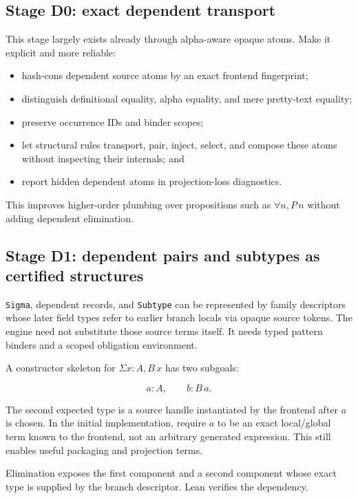 \documentclass[11pt]{article}
\newcommand{\code}[1]{\texttt{#1}}
\begin{document}
\subsection{Stage D0: exact dependent transport}

This stage largely exists already through alpha-aware opaque atoms.  Make it
explicit and more reliable:

\begin{itemize}
  \item hash-cons dependent source atoms by an exact frontend fingerprint;
  \item distinguish definitional equality, alpha equality, and mere pretty-text
    equality;
  \item preserve occurrence IDs and binder scopes;
  \item let structural rules transport, pair, inject, select, and compose these
    atoms without inspecting their internals; and
  \item report hidden dependent atoms in projection-loss diagnostics.
\end{itemize}

This improves higher-order plumbing over propositions such as
\(\forall n, P\,n\) without adding dependent elimination.

\subsection{Stage D1: dependent pairs and subtypes as certified structures}

\code{Sigma}, dependent records, and \code{Subtype} can be represented by
family descriptors whose later field types refer to earlier branch locals via
opaque source tokens.  The engine need not substitute those source terms
itself.  It needs typed pattern binders and a scoped obligation environment.

A constructor skeleton for \(\Sigma x:A, B\,x\) has two subgoals:

\[
  a : A, \qquad b : B\,a.
\]

The second expected type is a source handle instantiated by the frontend after
\(a\) is chosen.  In the initial implementation, require \(a\) to be an exact
local/global term known to the frontend, not an arbitrary generated expression.
This still enables useful packaging and projection terms.

Elimination exposes the first component and a second component whose exact type
is supplied by the branch descriptor.  Lean verifies the dependency.
\end{document}
